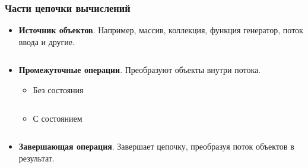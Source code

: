 \begin{frame}
\frametitle{Части цепочки вычислений} %
\begin{itemize}
	\item \textbf{Источник объектов}. Например, массив, коллекция, функция генератор, поток ввода и другие.
	\inputminted{java}{code/Producer.java}
	\item \textbf{Промежуточные операции}. Преобразуют объекты внутри потока.
	\begin{itemize}
		\item Без состояния
		\inputminted{java}{code/Stateless.java}
		\item С состоянием
		\inputminted{java}{code/Stateful.java}
	\end{itemize}
	\item \textbf{Завершающая операция}. Завершает цепочку, преобразуя поток объектов в результат.
	\inputminted{java}{code/Termination.java}
\end{itemize}
\end{frame}
